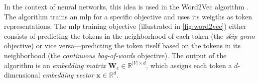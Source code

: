 {In the context of neural networks, this idea is used in the Word2Vec algorithm \cite{mikolov2013distributed}. The algorithm trains an \ac{mlp} for a specific objective and uses its weigths as token representations. The \ac{mlp} training objective (illustrated in \autoref{fig:word2vec}) either consists of predicting the tokens in the neighborhood of each token (the \emph{skip-gram} objective) or vice versa---predicting the token itself based on the tokens in its neighborhood (the \emph{continuous bag-of-words} objective). The output of the algorithm is an \textit{embedding matrix} $\mathbf{W}_e \in \mathbb{R}^{|V|\times d}$, which assigns each token a $d$-dimensional \textit{embedding vector} $\mathbf{x} \in \mathbb{R}^{d}$.

\begin{figure}[ht]
    \centering


\end{figure}}
